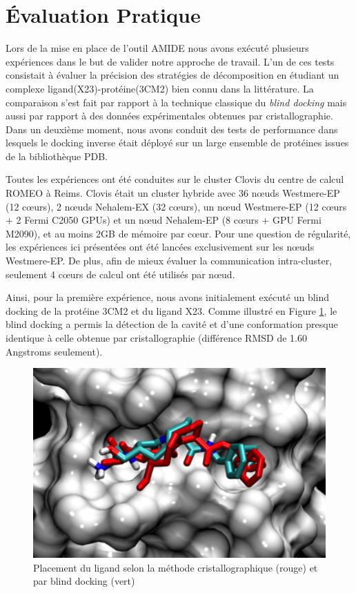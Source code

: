  \section{Évaluation Pratique}
 
 Lors de la mise en place de l'outil AMIDE nous avons exécuté plusieurs expériences dans le but de valider notre approche de travail. L'un de ces tests consistait à évaluer la précision des stratégies de décomposition en étudiant un complexe ligand(X23)-protéine(3CM2) bien connu dans la littérature. La comparaison s'est fait par rapport à la technique classique du \textit{blind docking} mais aussi par rapport à des données expérimentales obtenues par cristallographie. Dans un deuxième moment, nous avons conduit des tests de performance dans lesquels le docking inverse était déployé sur un large ensemble de protéines issues de la bibliothèque PDB.
 
Toutes les expériences ont été conduites sur le cluster Clovis du centre de calcul ROMEO à Reims. Clovis était un cluster hybride avec 36 n{\oe}uds Westmere-EP (12 c{\oe}urs), 2 n{\oe}uds Nehalem-EX (32 c{\oe}urs), un n{\oe}ud Westmere-EP (12 c{\oe}urs + 2 Fermi C2050 GPUs) et un n{\oe}ud Nehalem-EP (8 c{\oe}urs + GPU Fermi M2090), et au moins 2GB de mémoire par c{\oe}ur. Pour une question de régularité, les expériences ici présentées ont été lancées exclusivement sur les n{\oe}uds Westmere-EP. De plus, afin de mieux évaluer la communication intra-cluster, seulement 4 c{\oe}urs de calcul ont été utilisés par n{\oe}ud.
 
 Ainsi, pour la première expérience, nous avons initialement exécuté un blind docking de la protéine 3CM2 et du ligand X23. Comme illustré en  Figure \ref{fig:blind}, le blind docking a permis la détection de la cavité et d'une conformation presque identique à celle obtenue par cristallographie (différence RMSD de 1.60 Angstroms seulement).
 
 \begin{figure}[h]
 	\centering
 		\includegraphics[width=0.85\linewidth]{images/Romain/fig4-color} 
 		\caption{Placement du ligand selon la méthode cristallographique (rouge) et par blind docking (vert)}\label{fig:blind} %
 \end{figure}
 
